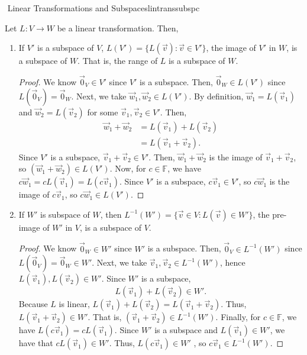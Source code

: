         \begin{theorem}{\Stop\,\,Linear Transformations and Subspaces}{lintranssubspc}

            Let \(L:V\to W\) be a linear transformation. Then,
            \begin{enumerate}
                \item If \(V'\) is a subspace of \(V\), \(L(V')=\{L(\vec{v}):\vec{v}\in V'\}\), the image of \(V'\) in \(W\), is a subspace of \(W\). That is, the range of \(L\) is a subspace of \(W\).
                \begin{proof}
                    We know \(\vec{0}_V\in V'\) since \(V'\) is a subspace. Then, \(\vec{0}_W\in L(V')\) since \(L(\vec{0}_V)=\vec{0}_W\). Next, we take \(\vec{w}_1,\vec{w}_2\in L(V')\). By definition, \(\vec{w}_1=L(\vec{v}_1)\) and \(\vec{w}_2=L(\vec{v}_2)\) for some \(\vec{v}_1,\vec{v}_2\in V'\). Then,
                    \begin{align*}
                        \vec{w}_1+\vec{w}_2&=L(\vec{v}_1)+L(\vec{v}_2) \\
                        &=L(\vec{v}_1+\vec{v}_2).
                    \end{align*}
                    Since \(V'\) is a subspace, \(\vec{v}_1+\vec{v}_2\in V'\). Then, \(\vec{w}_1+\vec{w}_2\) is the image of \(\vec{v}_1+\vec{v}_2\), so \((\vec{w}_1+\vec{w}_2)\in L(V')\). Now, for \(c\in\mathbb{F}\), we have \(c\vec{w}_1=cL(\vec{v}_1)=L(c\vec{v}_1)\). Since \(V'\) is a subspace, \(c\vec{v}_1\in V'\), so \(c\vec{w}_1\) is the image of \(c\vec{v}_1\), so \(c\vec{w}_1\in L(V')\).
                \end{proof}
                \item If \(W'\) is subspace of \(W\), then \(L^{-1}(W')=\{\vec{v}\in V:L(\vec{v})\in W'\}\), the pre-image of \(W'\) in \(V\), is a subspace of \(V\).
                \begin{proof}
                    We know \(\vec{0}_W\in W'\) since \(W'\) is a subspace. Then, \(\vec{0}_V\in L^{-1}(W')\) since \(L(\vec{0}_V)=\vec{0}_W\in W'\). Next, we take \(\vec{v}_1,\vec{v}_2\in L^{-1}(W')\), hence \(L(\vec{v}_1),L(\vec{v}_2)\in W'\). Since \(W'\) is a subspace,
                    \begin{equation*}
                        L(\vec{v}_1)+L(\vec{v}_2)\in W'.
                    \end{equation*}
                    Because \(L\) is linear, \(L(\vec{v}_1)+L(\vec{v}_2)=L(\vec{v}_1+\vec{v}_2)\). Thus, \(L(\vec{v}_1+\vec{v}_2)\in W'\). That is, \((\vec{v}_1+\vec{v}_2)\in L^{-1}(W')\). Finally, for \(c\in\mathbb{F}\), we have \(L(c\vec{v}_1)=cL(\vec{v}_1)\). Since \(W'\) is a subspace and \(L(\vec{v}_1)\in W'\), we have that \(cL(\vec{v}_1)\in W'\). Thus, \(L(c\vec{v}_1)\in W'\) , so \(c\vec{v}_1\in L^{-1}(W')\).
                \end{proof}
            \end{enumerate}
            
        \end{theorem}
        \pagebreak
